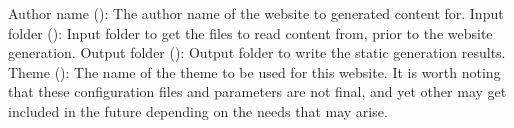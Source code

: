\markdownRendererOlEndTight \markdownRendererInterblockSeparator
{}\markdownRendererUlBeginTight
\markdownRendererUlItem Author name (): The author name of the website to generated content for. \markdownRendererUlItemEnd 
\markdownRendererUlItem Input folder (): Input folder to get the files to read content from, prior to the website generation.\markdownRendererUlItemEnd 
\markdownRendererUlItem Output folder (): Output folder to write the static generation results.\markdownRendererUlItemEnd 
\markdownRendererUlItem Theme (): The name of the theme to be used for this website.\markdownRendererUlItemEnd 
\markdownRendererUlEndTight \markdownRendererInterblockSeparator
{}It is worth noting that these configuration files and parameters are not final, and yet other may get included in the future depending on the needs that may arise. \markdownRendererDocumentEnd